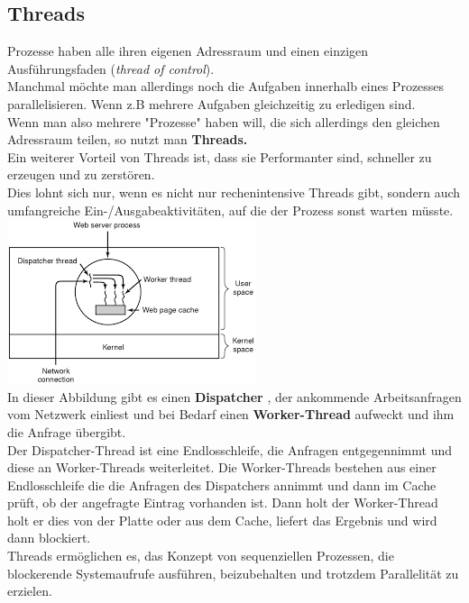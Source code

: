 \documentclass[12pt,a4paper]{univention}
\begin{document}
\subsection{Threads}
Prozesse haben alle ihren eigenen Adressraum und einen einzigen Ausführungsfaden (\textit{thread of control}).\\
Manchmal möchte man allerdings noch die Aufgaben innerhalb eines Prozesses parallelisieren. Wenn z.B mehrere Aufgaben gleichzeitig zu erledigen sind.\\
Wenn man also mehrere "Prozesse" haben will, die sich allerdings den gleichen Adressraum teilen, so nutzt man \textbf{Threads.}\\
Ein weiterer Vorteil von Threads ist, dass sie Performanter sind, schneller zu erzeugen und zu zerstören.\\
Dies lohnt sich nur, wenn es nicht nur rechenintensive Threads gibt, sondern auch umfangreiche Ein-/Ausgabeaktivitäten, auf die der Prozess sonst warten müsste.\\
\includegraphics[scale=1]{webserverthread.png}\\
In dieser Abbildung gibt es einen \textbf{Dispatcher} , der ankommende Arbeitsanfragen vom Netzwerk einliest und bei Bedarf   einen \textbf{Worker-Thread} aufweckt und ihm die Anfrage übergibt.\\
Der Dispatcher-Thread ist eine Endlosschleife, die Anfragen entgegennimmt und diese an Worker-Threads weiterleitet. Die Worker-Threads bestehen aus einer Endlosschleife die die Anfragen des Dispatchers annimmt und dann im Cache prüft, ob der angefragte Eintrag vorhanden ist. Dann holt der Worker-Thread holt er dies von der Platte oder aus dem Cache, liefert das Ergebnis und wird dann blockiert.\\
Threads ermöglichen es, das Konzept von sequenziellen Prozessen, die blockerende Systemaufrufe ausführen, beizubehalten und trotzdem Parallelität zu erzielen.
\end{document}
